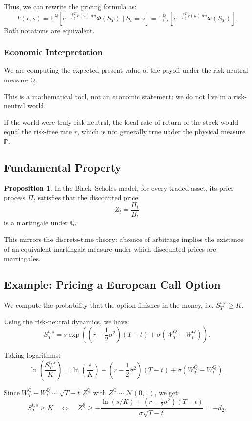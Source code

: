 \documentclass[12pt,a4paper]{article}
\theoremstyle{definition}
\newtheorem{proposition}{Proposition}[section]
\newcommand{\Q}{\mathbb{Q}}
\newcommand{\E}{\mathbb{E}}
\newcommand{\Prob}{\mathbb{P}}
\begin{document}
Thus, we can rewrite the pricing formula as:
\[
F(t, s) = \E^\Q\left[e^{-\int_t^T r(u) \, du}\Phi(S_T) \mid S_t = s\right] = \E_{t,s}^\Q\left[e^{-\int_t^T r(u) \, du}\Phi(S_T)\right].
\]
Both notations are equivalent.

\subsubsection{Economic Interpretation}

We are computing the expected present value of the payoff under the risk-neutral measure $\Q$.

This is a mathematical tool, not an economic statement: we do not live in a risk-neutral world.

If the world were truly risk-neutral, the local rate of return of the stock would equal the risk-free rate $r$, which is not generally true under the physical measure $\Prob$.

\subsection{Fundamental Property}

\begin{proposition}
In the Black–Scholes model, for every traded asset, its price process $\Pi_t$ satisfies that the discounted price
\[
Z_t = \frac{\Pi_t}{B_t}
\]
is a martingale under $\Q$.
\end{proposition}

This mirrors the discrete-time theory: absence of arbitrage implies the existence of an equivalent martingale measure under which discounted prices are martingales.

\subsection{Example: Pricing a European Call Option}

We compute the probability that the option finishes in the money, i.e. $S_T^{t,s} \geq K$.

Using the risk-neutral dynamics, we have:
\[
S_T^{t,s} = s \exp\left(\left(r - \frac{1}{2}\sigma^2\right)(T-t) + \sigma(W_T^Q - W_t^Q)\right).
\]

Taking logarithms:
\[
\ln\left(\frac{S_T^{t,s}}{K}\right) = \ln\left(\frac{s}{K}\right) + \left(r - \frac{1}{2}\sigma^2\right)(T-t) + \sigma(W_T^Q - W_t^Q).
\]

Since $W_T^\Q - W_t^\Q \sim \sqrt{T-t} \, Z^\Q$ with $Z^\Q \sim \mathcal{N}(0,1)$, we get:
\[
S_T^{t,s} \geq K \quad \Longleftrightarrow \quad Z^\Q \geq - \frac{\ln(s/K) + (r - \frac{1}{2}\sigma^2)(T-t)}{\sigma\sqrt{T-t}} = - d_2.
\]
\end{document}
